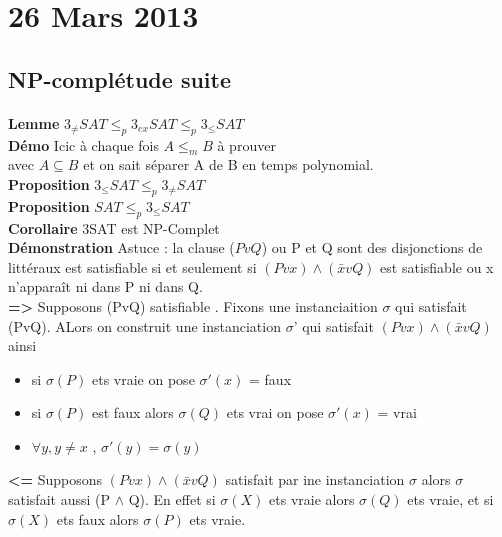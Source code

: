 \documentclass{article}
\begin{document}
\section{26 Mars 2013}
\subsection{NP-complétude suite}
\paragraph{} \textbf{Lemme} $3_{\neq} SAT \leq_p 3_{ex}SAT \leq_p 3_\leq SAT$\\\textbf{Démo} Icic à chaque fois $A \leq_m B $ à prouver\\avec $A\subseteq B$ et on sait séparer A de B en temps polynomial.\\\textbf{Proposition} $3_\leq SAT \leq_p 3_{\neq} SAT$\\\textbf{Proposition} $SAT \leq_p 3_{\leq}SAT$\\\textbf{Corollaire} 3SAT est NP-Complet\\\textbf{Démonstration} Astuce : la clause ($P vQ$) ou P et Q sont des disjonctions de littéraux est satisfiable si et seulement si $(Pvx) \wedge (\bar{x} v Q)$ est satisfiable ou x n’apparaît ni dans P ni dans Q.\\\textbf{=>} Supposons (PvQ) satisfiable . Fixons une instanciaition $\sigma$ qui satisfait (PvQ). ALors on construit une instanciation $\sigma$' qui satisfait $(Pvx) \wedge (\bar{x} v Q)$  ainsi
\begin{itemize}
\item si $\sigma(P)$ ets vraie on pose $\sigma'(x)$ = faux
\item si $\sigma(P)$ est faux alors $\sigma(Q)$ ets vrai on pose $\sigma'(x)$ = vrai
\item $\forall y ,y\neq x$ , $\sigma'(y) = \sigma(y)$
\end{itemize}
\textbf{<=} Supposons $(Pvx) \wedge (\bar{x} v Q)$ satisfait par ine instanciation $\sigma$ alors $\sigma$ satisfait aussi (P $\wedge$ Q). En effet si $\sigma(X)$ ets vraie alors $\sigma(Q)$ ets vraie, et si $\sigma(X)$ ets faux alors $\sigma(P)$ ets vraie.
\end{document}
